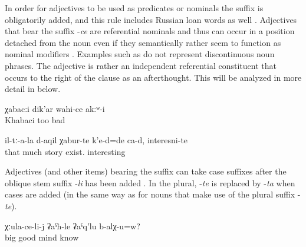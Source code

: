 In order for adjectives to be used as predicates  or nominals  the suffix is obligatorily added, and this rule includes Russian loan words as well . Adjectives that bear the suffix -\textit{ce} are referential nominals and thus can occur in a position detached from the noun even if they semantically rather seem to function as nominal modifiers . Examples such as  do not represent discontinuous noun phrases. The adjective is rather an independent referential constituent that occurs to the right of the clause as an afterthought. This will be analyzed in more detail in  below.

\begin{exe}
	\ex	\label{ex:Khabaci (name) was also not bad minor}
	\gll	χabacːi	dik'ar	wahi-ce	akːʷ-i\\
		Khabaci	too	bad	\\
	\glt	{}

	\ex	\label{ex:About them there were, are many stories, interesting (ones) minor@19c}
	\gll	il-tː-a-la	d-aqil	χabur-te	k'e-d=de	ca-d,	interesni-te\\
		that	much	story	exist.		interesting\\
	\glt	{}

\end{exe}

Adjectives (and other items) bearing the suffix can take case suffixes after the oblique stem suffix -\textit{li} has been added . In the plural, -\textit{te} is replaced by -\textit{ta} when cases are added (in the same way as for nouns that make use of the plural suffix -\textit{te}). 

\begin{exe}
	\ex	\label{ex:Does an older (person) know it better minor}
	\gll	χːula-ce-li-j	ʡaˁħ-le	ʡaˁq'lu	b-alχ-u=w?\\
		big	good	mind	know\\
	\glt	{}
\end{exe}

